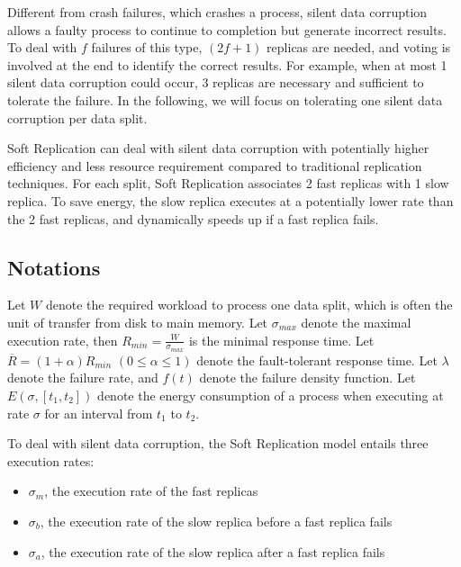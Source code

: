 Different from crash failures, which crashes a process, silent data corruption allows a faulty process to continue to completion but generate incorrect results. To deal with $f$ failures of this type, $(2f+1)$ replicas are needed, and voting is involved at the end to identify the correct results. For example, when at most 1 silent data corruption could occur, 3 replicas are necessary and sufficient to tolerate the failure. In the following, we will focus on tolerating one silent data corruption per data split. 

Soft Replication can deal with silent data corruption with potentially higher efficiency and less resource requirement compared to traditional replication techniques. For each split, Soft Replication associates 2 fast replicas with 1 slow replica. To save energy, the slow replica executes at a potentially lower rate than the 2 fast replicas, and dynamically speeds up if a fast replica fails. 

\subsection{Notations}
Let $W$ denote the required workload to process one data split, which is often the unit of transfer from disk to main memory. Let $\sigma_{max}$ denote the maximal execution rate, then $R_{min}=\frac{W}{\sigma_{max}}$ is the minimal response time. Let $\overline{R}=(1+\alpha)R_{min}$ $(0\leq \alpha \leq 1)$ denote the fault-tolerant response time. Let $\lambda$ denote the failure rate, and $f(t)$ denote the failure density function. Let $E(\sigma, [t_1, t_2])$ denote the energy consumption of a process when executing at rate $\sigma$ for an interval from $t_1$ to $t_2$.

To deal with silent data corruption, the Soft Replication model entails three execution rates:
\begin{itemize}
	\item $\sigma_{m}$, the execution rate of the fast replicas 
    \item $\sigma_{b}$, the execution rate of the slow replica before a fast replica fails
    \item $\sigma_{a}$, the execution rate of the slow replica after a fast replica fails
\end{itemize}

